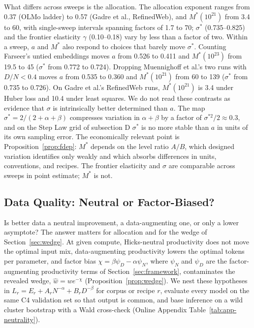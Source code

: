 What differs across sweeps is the allocation. The allocation exponent ranges from 0.37 (OLMo ladder) to 0.57 (Gadre
et al., RefinedWeb), and $M^*(10^{21})$ from 3.4 to 60, with single-sweep intervals spanning factors of 1.7 to 70;
$\sigma^*$ (0.735--0.825) and the frontier elasticity $\gamma$ (0.10--0.18) vary by less than a factor of two. Within a
sweep, $a$ and $M^*$ also respond to choices that barely move $\sigma^*$. Counting Farseer's untied embeddings moves
$a$ from 0.526 to 0.411 and $M^*(10^{23})$ from 19.5 to 45 ($\sigma^*$ from 0.772 to 0.724). Dropping Muennighoff et
al.'s two runs with $D/N<0.4$ moves $a$ from 0.535 to 0.360 and $M^*(10^{21})$ from 60 to 139 ($\sigma^*$ from 0.735
to 0.726). On Gadre et al.'s RefinedWeb runs, $M^*(10^{21})$ is 3.4 under Huber loss and 10.4 under least squares. We
do not read these contrasts as evidence that $\sigma$ is intrinsically better determined than $a$. The map
$\sigma^*=2/(2+\alpha+\beta)$ compresses variation in $\alpha+\beta$ by a factor of $\sigma^{*2}/2\approx0.3$, and on
the Step Law grid of subsection D $\sigma^*$ is no more stable than $a$ in units of its own sampling error. The
economically relevant point is Proposition~\ref{prop:fdep}: $M^*$ depends on the level ratio $A/B$, which designed
variation identifies only weakly and which absorbs differences in units, conventions, and recipes. The frontier
elasticity and $\sigma$ are comparable across sweeps in point estimate; $M^*$ is not.

\subsection{Data Quality: Neutral or Factor-Biased?}\label{sec:tech:quality}

Is better data a neutral improvement, a data-augmenting one, or only a lower asymptote? The answer matters for
allocation and for the wedge of Section~\ref{sec:wedge}. At given compute, Hicks-neutral productivity does not move
the optimal input mix, data-augmenting productivity lowers the optimal tokens per parameter, and factor bias
$\chi=\beta\psi_D-\alpha\psi_N$, where $\psi_N$ and $\psi_D$ are the factor-augmenting productivity terms of
Section~\ref{sec:framework}, contaminates the revealed wedge, $\hat w=we^{-\chi}$
(Proposition~\ref{prop:wedge}). We nest these hypotheses in $L_r=E_r+A_rN^{-\alpha}+B_rD^{-\beta}$ for corpus or
recipe $r$, evaluate every model on the same C4 validation set so that output is common, and base inference on a wild
cluster bootstrap with a Wald cross-check (Online Appendix Table~\ref{tab:app-neutrality}).

